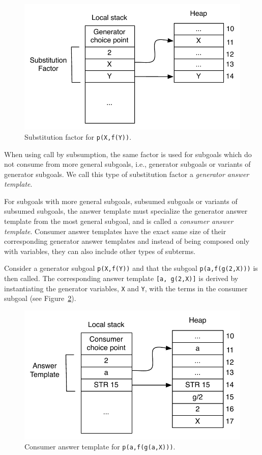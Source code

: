 \begin{figure}[ht]
  \centering
    \includegraphics[scale=0.6]{answer_template_generator.pdf}
  \caption{Substitution factor for \texttt{p(X,f(Y))}.}
  \label{fig:answer_template_generator}
\end{figure}

When using call by subsumption, the same factor is used for subgoals which do not
consume from more general subgoals, i.e., generator subgoals or variants of generator
subgoals. We call this type of substitution factor a \textit{generator answer template}.

For subgoals with more general subgoals, subsumed subgoals or variants of subsumed subgoals,
the answer template must specialize the generator answer template
from the most general subgoal, and is called a \textit{consumer answer template}.
Consumer answer templates have the exact same size of their corresponding generator answer templates
and instead of being composed only with variables, they can also include other types of subterms.

Consider a generator subgoal \texttt{p(X,f(Y))} and that the subgoal \texttt{p(a,f(g(2,X)))}
is then called. The corresponding answer template \texttt{[a,~g(2,X)]} is derived by instantiating
the generator variables, \texttt{X} and \texttt{Y}, with the terms in the consumer subgoal
(see Figure~\ref{fig:answer_template_consumer}).

\begin{figure}[ht]
  \centering
    \includegraphics[scale=0.6]{answer_template_consumer.pdf}
  \caption{Consumer answer template for \texttt{p(a,f(g(a,X)))}.}
  \label{fig:answer_template_consumer}
\end{figure}

